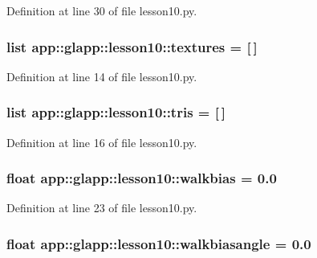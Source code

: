 Definition at line 30 of file lesson10.py.
\subsubsection{\setlength{\rightskip}{0pt plus 5cm}list {\bf app::glapp::lesson10::textures} = [$\,$]\hspace{0.3cm}{\tt  [static]}}\label{namespaceapp_1_1glapp_1_1lesson10_31dd09a3977edb7ac6022d0c7e33710f}




Definition at line 14 of file lesson10.py.
\subsubsection{\setlength{\rightskip}{0pt plus 5cm}list {\bf app::glapp::lesson10::tris} = [$\,$]\hspace{0.3cm}{\tt  [static]}}\label{namespaceapp_1_1glapp_1_1lesson10_6cfd6e205ae059d604c8d1f4e2d9cfe7}




Definition at line 16 of file lesson10.py.
\subsubsection{\setlength{\rightskip}{0pt plus 5cm}float {\bf app::glapp::lesson10::walkbias} = 0.0\hspace{0.3cm}{\tt  [static]}}\label{namespaceapp_1_1glapp_1_1lesson10_2d73fdfd4beb31c07ea94952df450e4b}




Definition at line 23 of file lesson10.py.
\subsubsection{\setlength{\rightskip}{0pt plus 5cm}float {\bf app::glapp::lesson10::walkbiasangle} = 0.0\hspace{0.3cm}{\tt  [static]}}\label{namespaceapp_1_1glapp_1_1lesson10_f0251475c35313365e1bcc2f2c215c62}




